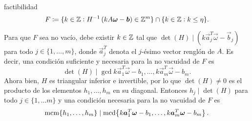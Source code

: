 factibilidad
\begin{equation}
	\label{eq:feas-set}
	F \coloneq \lbrace k \in \mathbb{Z} \vcentcolon H^{-1}\left(kA\boldsymbol{\omega} - \boldsymbol{b}\right) \in \mathbb{Z}^m \rbrace
	\cap \lbrace k \in \mathbb{Z} \vcentcolon k \leq \eta \rbrace.
\end{equation}
\begin{observation}
	Para que $F$ sea no vacío, debe existir $k \in \mathbb{Z}$ tal que $\det(H) \mid (k\vec{a}_j^T
	\vec{\omega} - \vec{b}_j)$ para todo $j \in \lbrace 1, \ldots, m \rbrace$, donde $\vec{a}^T_j$
	denota el $j$-ésimo vector renglón de $A$. Es decir, una condición suficiente y necesaria para
	la no vacuidad de $F$ es
	\begin{equation*}
		\det(H) \mid \gcd{k\vec{a}_1^T\vec{\omega} - b_1, \ldots, k\vec{a}_m^T\vec{\omega} - b_m}.
	\end{equation*}
	Ahora bien, $H$ es triangular inferior e invertible, por lo que $\det(H) \neq 0$ es el producto
	de los elementos $h_1, \ldots, h_m$ en su diagonal. Entonces $h_j \mid \det(H)$ para todo $j \in
	\lbrace 1, \ldots m \rbrace$ y una condición necesaria para la no vacuidad de $F$ es
	\begin{equation*}
		\mathop{\mathrm{mcm}{\left\lbrace h_1, \ldots, h_m \right\rbrace}} \mid \mathop{\mathrm{mcd}{\left\lbrace k\boldsymbol{a}_1^T\boldsymbol{\omega} - b_1, \ldots, k\boldsymbol{a}_m^T\boldsymbol{\omega} - b_m \right\rbrace}}.
	\end{equation*}
\end{observation}

